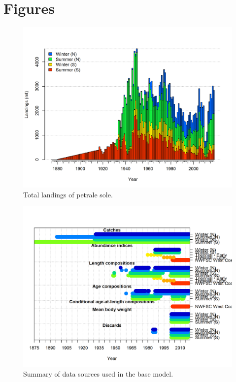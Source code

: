 \documentclass[12pt,]{article}
\begin{document}
\clearpage

\section{Figures}\label{figures}

\FloatBarrier

\begin{figure}
\centering
\includegraphics{r4ss/plots_mod1/catch2 landings stacked.png}
\caption{Total landings of petrale sole. \label{fig:Catch}}
\end{figure}

\FloatBarrier

\begin{figure}
\centering
\includegraphics{r4ss/plots_mod1/data_plot.png}
\caption{Summary of data sources used in the base model.
\label{fig:data_plot}}
\end{figure}
\end{document}
